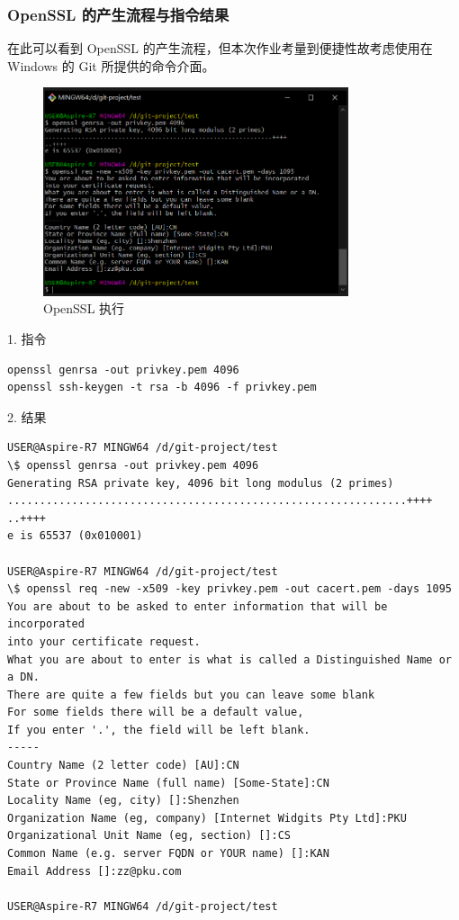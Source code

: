 \subsubsection{OpenSSL 的产生流程与指令结果}

在此可以看到 OpenSSL 的产生流程，但本次作业考量到便捷性故考虑使用在 Windows 的 Git 所提供的命令介面。

\begin{figure}[htb]
\centering 
\includegraphics[width=0.80\textwidth]{img/ch1s2m3.png} 
\caption{OpenSSL 执行}
\label{Test}
\end{figure}

1. 指令

\begin{Verbatim}
openssl genrsa -out privkey.pem 4096
openssl ssh-keygen -t rsa -b 4096 -f privkey.pem
\end{Verbatim}

2. 结果

\begin{Verbatim}
USER@Aspire-R7 MINGW64 /d/git-project/test
\$ openssl genrsa -out privkey.pem 4096
Generating RSA private key, 4096 bit long modulus (2 primes)
..............................................................++++
..++++
e is 65537 (0x010001)

USER@Aspire-R7 MINGW64 /d/git-project/test
\$ openssl req -new -x509 -key privkey.pem -out cacert.pem -days 1095
You are about to be asked to enter information that will be incorporated
into your certificate request.
What you are about to enter is what is called a Distinguished Name or a DN.
There are quite a few fields but you can leave some blank
For some fields there will be a default value,
If you enter '.', the field will be left blank.
-----
Country Name (2 letter code) [AU]:CN
State or Province Name (full name) [Some-State]:CN
Locality Name (eg, city) []:Shenzhen
Organization Name (eg, company) [Internet Widgits Pty Ltd]:PKU
Organizational Unit Name (eg, section) []:CS
Common Name (e.g. server FQDN or YOUR name) []:KAN
Email Address []:zz@pku.com

USER@Aspire-R7 MINGW64 /d/git-project/test
\end{Verbatim}

